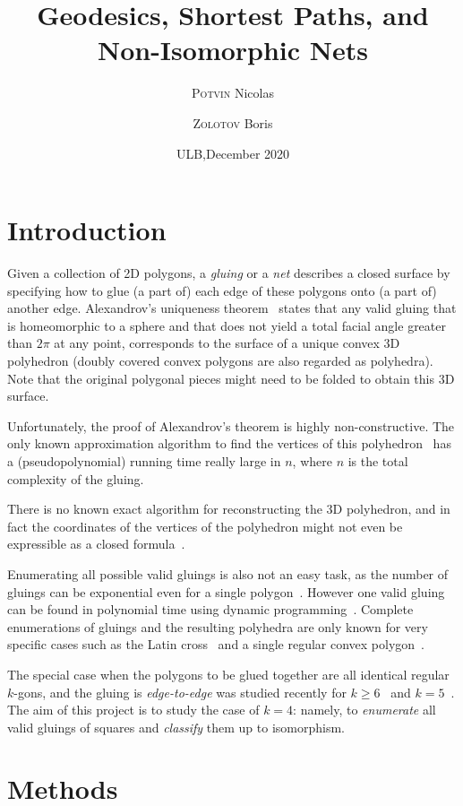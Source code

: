 \documentclass[a4paper,11pt]{article}
\title{Geodesics, Shortest Paths, and Non-Isomorphic Nets}
\author{{\scshape Potvin} Nicolas \and {\scshape Zolotov} Boris}
\date{ULB,\quad December 2020}
\begin{document}
 \maketitle

\section{Introduction}

Given a collection of 2D polygons, a \emph{gluing} or a \emph{net} describes a closed surface by specifying how to glue (a part of) each edge of these polygons onto (a part of) another edge. Alexandrov's uniqueness theorem~\cite{alex} states that any valid gluing that is homeomorphic to a sphere and that does not yield a total facial angle greater than $2\pi$ at any point, corresponds to the surface of a unique convex 3D polyhedron (doubly covered convex polygons are also regarded as polyhedra). Note that the original polygonal pieces might need to be folded to obtain this 3D surface.

Unfortunately, the proof of Alexandrov's theorem is highly non-constructive. The only known approximation algorithm to find the vertices of this polyhedron~\cite{kpd09-approx} has a (pseudopolynomial) running time really large in $n$, where $n$ is the total complexity of the gluing.

There is no known exact algorithm for reconstructing the 3D polyhedron, and in fact the coordinates of the vertices of the polyhedron might not even be expressible as a closed formula~\cite{bannister2014galois}.

Enumerating all possible valid gluings is also not an easy task, as the number of gluings can be exponential even for a single polygon~\cite{DDLO02}. However one valid gluing can be found in polynomial time using dynamic programming~\cite{DO07,lo96-dynprog}. Complete enumerations of gluings and the resulting polyhedra are only known for very specific cases such as the Latin cross~\cite{ddlop99} and a single regular convex polygon~\cite{DO07}.

The special case when the polygons to be glued together are all identical regular $k$-gons, and the gluing is \emph{edge-to-edge} was studied recently for $k \ge 6$~\cite{kl17-hex} and $k=5$~\cite{alz-penta}. The aim of this project is to study the case of $k=4$: namely, to {\it enumerate} all valid gluings of squares and {\it classify} them up to isomorphism.

\section{Methods}
\end{document}

